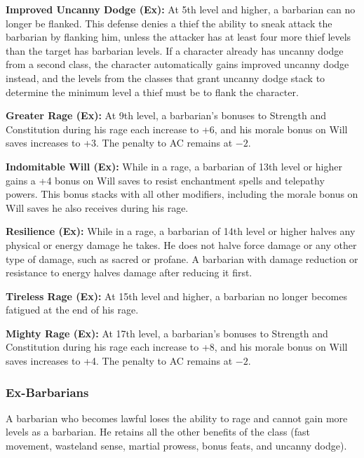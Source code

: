 \textbf{Improved Uncanny Dodge (Ex):} At 5th level and higher, a barbarian can no longer be flanked. This defense denies a thief the ability to sneak attack the barbarian by flanking him, unless the attacker has at least four more thief levels than the target has barbarian levels. If a character already has uncanny dodge from a second class, the character automatically gains improved uncanny dodge instead, and the levels from the classes that grant uncanny dodge stack to determine the minimum level a thief must be to flank the character.

\textbf{Greater Rage (Ex):} At 9th level, a barbarian's bonuses to Strength and Constitution during his rage each increase to +6, and his morale bonus on Will saves increases to +3. The penalty to AC remains at $-2$.

\textbf{Indomitable Will (Ex):} While in a rage, a barbarian of 13th level or higher gains a +4 bonus on Will saves to resist enchantment spells and telepathy powers. This bonus stacks with all other modifiers, including the morale bonus on Will saves he also receives during his rage.

\textbf{Resilience (Ex):} While in a rage, a barbarian of 14th level or higher halves any physical or energy damage he takes. He does not halve force damage or any other type of damage, such as sacred or profane. A barbarian with damage reduction or resistance to energy halves damage after reducing it first.

\textbf{Tireless Rage (Ex):} At 15th level and higher, a barbarian no longer becomes fatigued at the end of his rage.

\textbf{Mighty Rage (Ex):} At 17th level, a barbarian's bonuses to Strength and Constitution during his rage each increase to +8, and his morale bonus on Will saves increases to +4. The penalty to AC remains at $-2$.

\subsubsection{Ex-Barbarians}
A barbarian who becomes lawful loses the ability to rage and cannot gain more levels as a barbarian. He retains all the other benefits of the class (fast movement, wasteland sense, martial prowess, bonus feats, and uncanny dodge).



